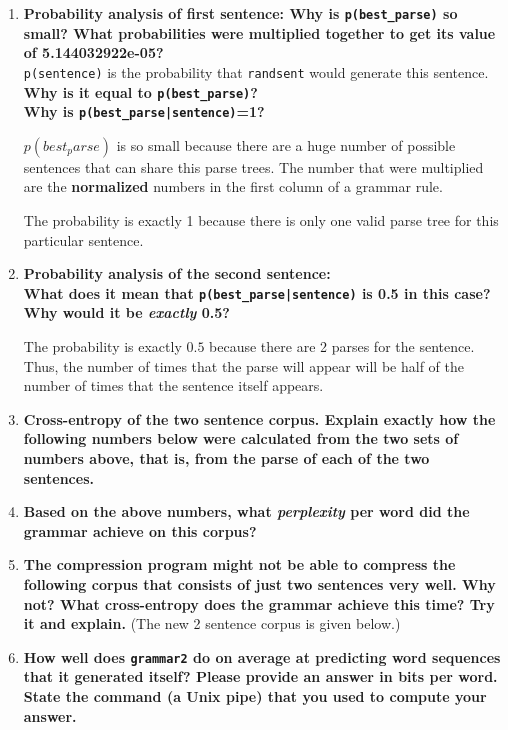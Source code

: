 \documentclass[10pt]{article}
\begin{document}
\begin{enumerate}
\begin{enumerate}
\begin{enumerate} 
\item {\bf Probability analysis of first sentence: Why is \verb|p(best_parse)| so small?  What probabilities were
  multiplied together to get its value of 5.144032922e-05?}\\
\noindent
\verb|p(sentence)| is the probability that \verb|randsent| would
  generate this sentence. {\bf Why is it equal to \verb|p(best_parse)|?}\\
\noindent
{\bf Why is \verb+p(best_parse|sentence)+=1?}

$p(best_parse)$ is so small because there are a huge number of possible sentences that can share this parse trees. The number that were multiplied are the {\bf normalized} numbers in the first column of a grammar rule.

The probability is exactly 1 because there is only one valid parse tree for this particular sentence.


\item {\bf Probability analysis of the second sentence:  \\
\noindent
What does it mean that \verb+p(best_parse|sentence)+ is 0.5 in this
case? \\
\noindent
Why would it be {\it exactly} 0.5?}


The probability is exactly $0.5$ because there are 2 parses for the sentence. Thus, the number of times that the parse will appear will be half of the number of times that the sentence itself appears.


\item {\bf Cross-entropy of the two sentence corpus. Explain exactly
    how the following numbers below were calculated from the two sets
    of numbers above, that is, from the parse of each of the two
    sentences.}



\item {\bf Based on the above numbers, what {\it perplexity} per word did
  the grammar achieve on this corpus?}

\item {\bf The compression program might not be able to compress the
    following corpus that consists of just two sentences very well.
    Why not? What cross-entropy does the grammar achieve this time?
    Try it and explain.}  (The new 2 sentence corpus is given below.)

\item {\bf How well does {\tt grammar2} do on average at predicting
    word sequences that it generated itself?  Please provide an answer
    in bits per word.  State the command (a Unix pipe) that you used
    to compute your answer.}


\end{enumerate}
\end{enumerate}
\end{enumerate}
\end{document}
